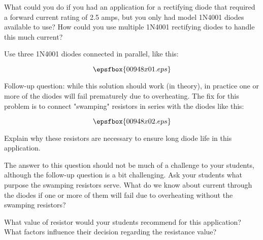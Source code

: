 

What could you do if you had an application for a rectifying diode that required a forward current rating of 2.5 amps, but you only had model 1N4001 diodes available to use?  How could you use multiple 1N4001 rectifying diodes to handle this much current?







Use three 1N4001 diodes connected in parallel, like this:

$$\epsfbox{00948x01.eps}$$

\vskip 10pt

Follow-up question: while this solution should work (in theory), in practice one or more of the diodes will fail prematurely due to overheating.  The fix for this problem is to connect "swamping" resistors in series with the diodes like this:

$$\epsfbox{00948x02.eps}$$

Explain why these resistors are necessary to ensure long diode life in this application.







The answer to this question should not be much of a challenge to your students, although the follow-up question is a bit challenging.  Ask your students what purpose the swamping resistors serve.  What do we know about current through the diodes if one or more of them will fail due to overheating without the swamping resistors?

What value of resistor would your students recommend for this application?  What factors influence their decision regarding the resistance value?





